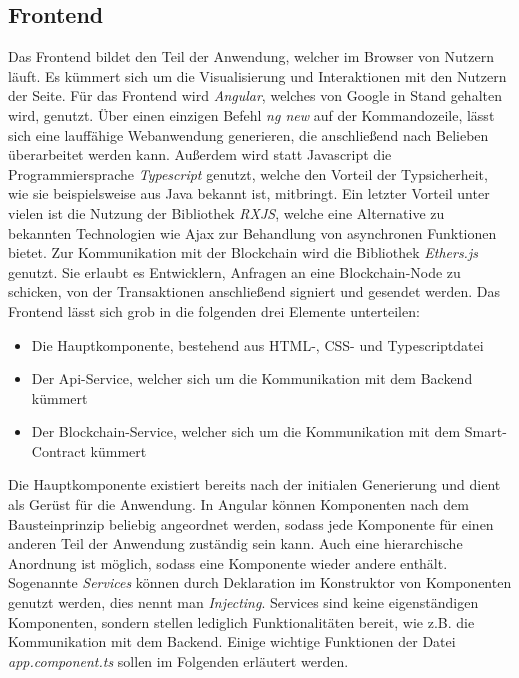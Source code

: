 \subsection{Frontend}
Das Frontend bildet den Teil der Anwendung, welcher im Browser von Nutzern läuft. Es kümmert sich um die Visualisierung und Interaktionen mit den Nutzern der Seite.
Für das Frontend wird \emph{Angular}, welches von Google in Stand gehalten wird, genutzt. Über einen einzigen Befehl \emph{ng new} auf der Kommandozeile, lässt sich eine lauffähige Webanwendung generieren, die anschließend nach Belieben überarbeitet werden kann. Außerdem wird statt Javascript die Programmiersprache \emph{Typescript} genutzt, welche den Vorteil der Typsicherheit, wie sie beispielsweise aus Java bekannt ist, mitbringt. Ein letzter Vorteil unter vielen ist die Nutzung der Bibliothek \emph{RXJS}, welche eine Alternative zu bekannten Technologien wie Ajax zur Behandlung von asynchronen Funktionen bietet.
Zur Kommunikation mit der Blockchain wird die Bibliothek \emph{Ethers.js} genutzt. Sie erlaubt es Entwicklern, Anfragen an eine Blockchain-Node zu schicken, von der Transaktionen anschließend signiert und gesendet werden. Das Frontend lässt sich grob in die folgenden drei Elemente unterteilen:
\begin{itemize}
	\item Die Hauptkomponente, bestehend aus HTML-, CSS- und Typescriptdatei
	\item Der Api-Service, welcher sich um die Kommunikation mit dem Backend kümmert
	\item Der Blockchain-Service, welcher sich um die Kommunikation mit dem Smart-Contract kümmert
\end{itemize}
Die Hauptkomponente existiert bereits nach der initialen Generierung und dient als Gerüst für die Anwendung. In Angular können Komponenten nach dem Bausteinprinzip beliebig angeordnet werden, sodass jede Komponente für einen anderen Teil der Anwendung zuständig sein kann. Auch eine hierarchische Anordnung ist möglich, sodass eine Komponente wieder andere enthält. Sogenannte \emph{Services} können durch Deklaration im Konstruktor von Komponenten genutzt werden, dies nennt man \emph{Injecting}. Services sind keine eigenständigen Komponenten, sondern stellen lediglich Funktionalitäten bereit, wie z.B. die Kommunikation mit dem Backend. Einige wichtige Funktionen der Datei \emph{app.component.ts} sollen im Folgenden erläutert werden.
